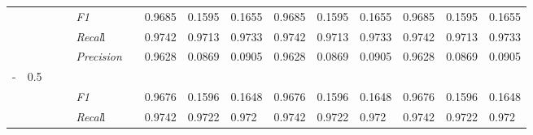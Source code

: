 \begin{table}[]
\begin{tabularx}{\textwidth}{XXlllllllllllll@{}}
                                                                    &                                                                     &                                                           &    & \textit{F1} &                                                      & 0.9685        & 0.1595        & 0.1655        & 0.9685        & 0.1595        & 0.1655        & 0.9685        & 0.1595        & 0.1655        \\
                                                                    &                                                                     &                                                           &    & \textit{Recal}l &                                                      & 0.9742    & 0.9713    & 0.9733    & 0.9742    & 0.9713    & 0.9733    & 0.9742    & 0.9713    & 0.9733    \\
                                                                    &                                                                     &                                                           &    & \textit{Precision} &                                                      & 0.9628 & 0.0869 & 0.0905 & 0.9628 & 0.0869 & 0.0905 & 0.9628 & 0.0869 & 0.0905 \\ \midrule
- & 0.5 &  &  &                                                              &                                                                   &                                                             &                                                               &                                                                    &                                                              &                                                               &                                                                    &                                                              \\
                                                                    &                                                                     &                                                           &    & \textit{F1} &                                                      & 0.9676        & 0.1596        & 0.1648        & 0.9676        & 0.1596        & 0.1648        & 0.9676        & 0.1596        & 0.1648        \\
                                                                    &                                                                     &                                                           &    & \textit{Recal}l &                                                      & 0.9742    & 0.9722    & 0.972    & 0.9742    & 0.9722    & 0.972    & 0.9742    & 0.9722    & 0.972    \\

\end{tabularx}
\end{table}
